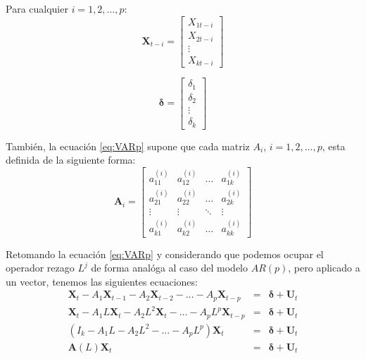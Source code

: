 \documentclass[
]{book}
\begin{document}
Para cualquier \(i = 1, 2, \ldots, p\):
\begin{equation*}
    \mathbf{X}_{t-i} = 
    \begin{bmatrix}
    X_{1t-i} \\ X_{2t-i} \\ \vdots \\ X_{kt-i}
    \end{bmatrix}
\end{equation*}

\begin{equation*}
    \mathbf{\delta} = 
    \begin{bmatrix}
    \delta_{1} \\ \delta_{2} \\ \vdots \\ \delta_{k}
    \end{bmatrix}
\end{equation*}

También, la ecuación \eqref{eq:VARp} supone que cada matriz \(A_i\), \(i = 1, 2, \ldots, p\), esta definida de la siguiente forma:
\begin{equation*}
    \mathbf{A}_i = 
    \begin{bmatrix}
    a^{(i)}_{11} & a^{(i)}_{12} & \ldots & a^{(i)}_{1k} \\ a^{(i)}_{21} & a^{(i)}_{22} & \ldots & a^{(i)}_{2k} \\ \vdots & \vdots & \ddots & \vdots \\ a^{(i)}_{k1} & a^{(i)}_{k2} & \ldots & a^{(i)}_{kk}
    \end{bmatrix}
\end{equation*}

Retomando la ecuación \eqref{eq:VARp} y considerando que podemos ocupar el operador rezago \(L^j\) de forma analóga al caso del modelo \(AR(p)\), pero aplicado a un vector, tenemos las siguientes ecuaciones:
\begin{eqnarray}
    \mathbf{X}_t - A_1 \mathbf{X}_{t-1} - A_2 \mathbf{X}_{t-2} - \ldots - A_p \mathbf{X}_{t-p} & = & \mathbf{\delta} + \mathbf{U}_{t} \nonumber \\
    \mathbf{X}_t - A_1 L \mathbf{X}_{t} - A_2 L^2 \mathbf{X}_{t} - \ldots - A_p L^p \mathbf{X}_{t-p} & = & \mathbf{\delta} + \mathbf{U}_{t} \nonumber \\
    (I_k - A_1 L - A_2 L^2 - \ldots - A_p L^p) \mathbf{X}_t & = & \mathbf{\delta} + \mathbf{U}_{t} \nonumber \\
    \mathbf{A}(L) \mathbf{X}_t & = & \mathbf{\delta} + \mathbf{U}_{t}
    \label{eq:VARCorto}
\end{eqnarray}
\end{document}
